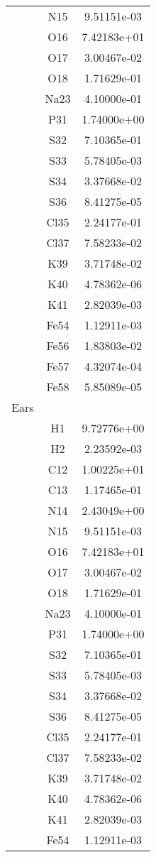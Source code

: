 \begin{centering}
\begin{longtable}{l c c}
& N15 & 9.51151e-03 \\ 
& O16 & 7.42183e+01 \\ 
& O17 & 3.00467e-02 \\ 
& O18 & 1.71629e-01 \\ 
& Na23 & 4.10000e-01 \\ 
& P31 & 1.74000e+00 \\ 
& S32 & 7.10365e-01 \\ 
& S33 & 5.78405e-03 \\ 
& S34 & 3.37668e-02 \\ 
& S36 & 8.41275e-05 \\ 
& Cl35 & 2.24177e-01 \\ 
& Cl37 & 7.58233e-02 \\ 
& K39 & 3.71748e-02 \\ 
& K40 & 4.78362e-06 \\ 
& K41 & 2.82039e-03 \\ 
& Fe54 & 1.12911e-03 \\ 
& Fe56 & 1.83803e-02 \\ 
& Fe57 & 4.32074e-04 \\ 
& Fe58 & 5.85089e-05 \\ 
\hline
Ears & & \\
\hline
& H1 & 9.72776e+00 \\ 
& H2 & 2.23592e-03 \\ 
& C12 & 1.00225e+01 \\ 
& C13 & 1.17465e-01 \\ 
& N14 & 2.43049e+00 \\ 
& N15 & 9.51151e-03 \\ 
& O16 & 7.42183e+01 \\ 
& O17 & 3.00467e-02 \\ 
& O18 & 1.71629e-01 \\ 
& Na23 & 4.10000e-01 \\ 
& P31 & 1.74000e+00 \\ 
& S32 & 7.10365e-01 \\ 
& S33 & 5.78405e-03 \\ 
& S34 & 3.37668e-02 \\ 
& S36 & 8.41275e-05 \\ 
& Cl35 & 2.24177e-01 \\ 
& Cl37 & 7.58233e-02 \\ 
& K39 & 3.71748e-02 \\ 
& K40 & 4.78362e-06 \\ 
& K41 & 2.82039e-03 \\ 
& Fe54 & 1.12911e-03 \\ 

\end{longtable}
\end{centering}
